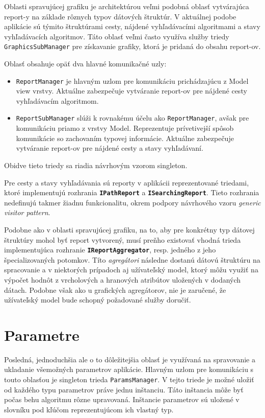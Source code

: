 Oblasti spravujúcej grafiku je architektúrou veľmi podobná oblasť vytvárajúca report-y na základe rôznych typov dátových štruktúr. V aktuálnej podobe aplikácie sú týmito štruktúrami cesty, nájdené vyhľadávacími algoritmami a stavy vyhľadávacích algoritmov. Táto oblasť veľmi často využíva služby triedy \texttt{GraphicsSubManager} pre získavanie grafiky, ktorá je pridaná do obsahu report-ov.

Oblasť obsahuje opäť dva hlavné komunikačné uzly:
\begin{itemize}
    \item \texttt{ReportManager} je hlavným uzlom pre komunikáciu prichádzajúcu z Model view vrstvy. Aktuálne zabezpečuje vytváranie report-ov pre nájdené cesty vyhľadávacím algoritmom.
    \item \texttt{ReportSubManager} slúži k rovnakému účelu ako \texttt{ReportManager}, avšak pre komunikáciu priamo z vrstvy Model. Reprezentuje prívetivejší spôsob komunikácie so zachovaním typovej informácie. Aktuálne zabezpečuje vytváranie report-ov pre nájdené cesty a stavy vyhľadávaní.
\end{itemize}
Obidve tieto triedy sa riadia návrhovým vzorom singleton.

\bigskip

Pre cesty a stavy vyhľadávania sú reporty v aplikácii reprezentované triedami, ktoré implementujú rozhrania \textbf{\texttt{IPathReport}} a \textbf{\texttt{ISearchingReport}}. Tieto rozhrania nedefinujú takmer žiadnu funkcionalitu, okrem podpory návrhového vzoru \textit{generic visitor pattern}.

Podobne ako v oblasti spravujúcej grafiku, na to, aby pre konkrétny typ dátovej štruktúry mohol byť report vytvorený, musí preňho existovať vhodná trieda implementujúca rozhranie \textbf{\texttt{IReportAggregator}}, resp. jedného z jeho špecializovaných potomkov. Títo \textit{agregátori} následne dostanú dátovú štruktúru na spracovanie a v niektorých prípadoch aj užívateľský model, ktorý môžu využiť na výpočet hodnôt z vrcholových a hranových atribútov uložených v dodaných dátach. Podobne však ako u grafických agregátorov, nie je zaručené, že užívateľský model bude schopný požadované služby doručiť. 

\section{Parametre}

Posledná, jednoduchšia ale o to dôležitejšia oblasť je využívaná na spravovanie a ukladanie všemožných parametrov aplikácie. Hlavným uzlom pre komunikáciu s touto oblasťou je singleton trieda \texttt{ParamsManager}. V tejto triede je možné uložiť od každého typu parametrov práve jednu inštanciu. Táto inštancia môže byť počas behu algoritmu rôzne upravovaná. Inštancie parametrov sú uložené v slovníku pod kľúčom reprezentujúcom ich vlastný typ.  

